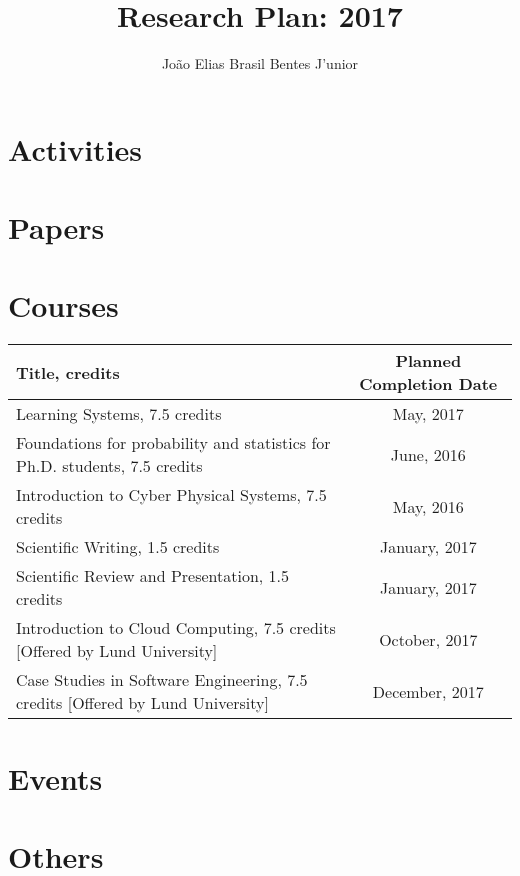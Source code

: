 \documentclass[]{report}
\title{Research Plan: 2017}
\author{Jo\~{a}o Elias Brasil Bentes J'{u}nior}
\begin{document}
\maketitle

\section*{Activities}

\section*{Papers}

\section*{Courses}

\begin{center}
	\label{courses}
	\begin{tabular}{|p{7.5cm}|c|} 	 
		\hline	
		\textbf{Title, credits} & \textbf{Planned Completion Date} \\ \hline	
		 Learning Systems, 7.5 credits & May, 2017 \\ \hline	
		 Foundations for probability and statistics for Ph.D. students, 7.5 credits & June, 2016 \\ \hline	
	 	 Introduction to Cyber Physical Systems, 7.5 credits & May, 2016 \\ \hline	
		 Scientific Writing, 1.5 credits & January, 2017 \\ \hline	
		 Scientific Review and Presentation, 1.5 credits & January, 2017 \\ \hline
		 Introduction to Cloud Computing, 7.5 credits [Offered by Lund University] & October, 2017 \\ \hline	
		 Case Studies in Software Engineering, 7.5 credits [Offered by Lund University] & December, 2017 \\ \hline			 		 
	\end{tabular}
\end{center}

\section*{Events}

\section*{Others}
\end{document}
